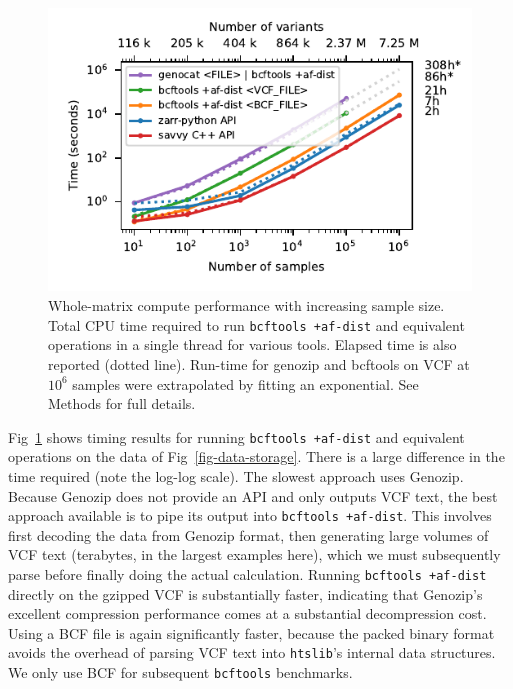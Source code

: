 \documentclass[a4paper,num-refs]{oup-contemporary}
\begin{document}
\begin{figure}
\includegraphics{figures/whole-matrix-compute}
\caption{Whole-matrix compute performance with increasing sample size.
Total CPU time required to run \texttt{bcftools +af-dist}
and equivalent operations in a single thread for various tools.
Elapsed time is also reported (dotted line). Run-time for genozip
and bcftools on VCF
at $10^6$ samples were extrapolated by fitting an exponential.
See Methods for full details.
\label{fig-whole-matrix-compute}}
\end{figure}

Fig~\ref{fig-whole-matrix-compute} shows timing results 
for running \texttt{bcftools +af-dist} and equivalent operations 
on the data of Fig~\ref{fig-data-storage}. There is a large
difference in the time required (note the log-log scale). 
The slowest approach uses Genozip. Because Genozip does not
provide an API and only outputs VCF text, the best approach available 
is to pipe its output into \texttt{bcftools +af-dist}. 
This involves first decoding the data from Genozip format,
then generating large volumes  of VCF text (terabytes, in the 
largest examples here), which we must 
subsequently parse before finally doing the actual calculation. 
Running \texttt{bcftools +af-dist} directly on the gzipped VCF
is substantially faster, indicating that Genozip's excellent
compression performance comes at a substantial decompression cost.
Using a BCF file is again significantly faster,
because the packed binary format avoids the overhead of parsing 
VCF text into \texttt{htslib}'s internal data structures. 
We only use BCF for subsequent \texttt{bcftools} benchmarks.
\end{document}
